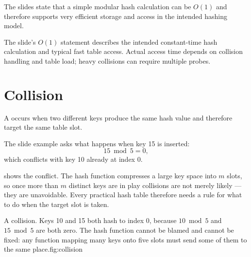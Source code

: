 The slides state that a simple modular hash calculation can be $O(1)$ and therefore supports very efficient storage and access in the intended hashing model.

\begin{clarification}
The slide's $O(1)$ statement describes the intended constant-time hash calculation and typical fast table access. Actual access time depends on collision handling and table load; heavy collisions can require multiple probes.
\end{clarification}

\section{Collision}

A  occurs when two different keys produce the same hash value and therefore target the same table slot.

The slide example asks what happens when key 15 is inserted:
\[
15\bmod5=0,
\]
which conflicts with key 10 already at index 0.

 shows the conflict. The hash function compresses a large key space
into $m$ slots, so once more than $m$ distinct keys are in play collisions are not merely
likely --- they are unavoidable. Every practical hash table therefore needs a rule for what
to do when the target slot is taken.

\begin{utpfig}{A collision. Keys 10 and 15 both hash to index 0, because $10\bmod5$ and
$15\bmod5$ are both zero. The hash function cannot be blamed and cannot be fixed: any
function mapping many keys onto five slots must send some of them to the same
place.}{fig:collision}
\end{utpfig}

